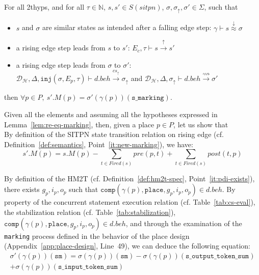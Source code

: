 \begin{lemma}
  \label{lem:re-eq-marking}
  For all \hm2thyps{}, and for all $\tau\in\mathbb{N}$,
  $s,s'\in{}S(sitpn)$, $\sigma,\sigma_\uparrow,\sigma'\in\Sigma$, such
  that
  \begin{itemize}
  \item $s$ and $\sigma$ are similar states as intended after a
    falling edge step:
    $\gamma\vdash{}s\stackrel{\downarrow}{\approx}\sigma$
  \item a rising edge step leads from $s$ to $s'$:
    $E_c,\tau\vdash{}s\xrightarrow{\uparrow}s'$
  \item a rising edge step leads from $\sigma$ to $\sigma'$:\\
    $\mathcal{D}_\mathcal{H},\Delta,\mathtt{inj}(\sigma,E_p,\tau)\vdash{}d.beh\xrightarrow{cs_{\uparrow}}\sigma_{\uparrow}$
    and
    $\mathcal{D}_\mathcal{H},\Delta,\sigma_{\uparrow}\vdash{}d.beh\xrightarrow{\rightsquigarrow}\sigma'$
  \end{itemize}
  then
  $\forall{}p\in{}P,~s'.M(p)=\sigma'(\gamma(p))(\mathtt{s\_marking})$.
  
\end{lemma}

Given all the elements and assuming all the hypotheses expressed in
Lemma~\ref{lem:re-eq-marking}, then, given a place $p\in{}P$, let us
show that \\

By definition of the SITPN state transition relation on rising edge
(cf. Definition~\ref{def:semantics}, Point~\ref{it:new-marking}), we
have:
\begin{equation}\label{eq:re-eq-marking-eqmp}
  s'.M(p)=s.M(p)-\sum\limits_{t\in{}Fired(s)}pre(p,t)+\sum\limits_{t\in{}Fired(s)}post(t,p)
\end{equation}

By definition of the HM2T (cf. Definition~\ref{def:hm2t-spec},
Point~\ref{it:pdi-exists}), there exists $g_p,i_p,o_p$ such that
$\mathtt{comp}(\gamma(p),\mathtt{place},g_p,i_p,o_p)\in{}d.beh$.  By
property of the \hvhdl{} concurrent statement execution relation
(cf. Table~\ref{tab:cs-eval}), the stabilization relation
(cf. Table~\ref{tab:stabilization}),
$\mathtt{comp}(\gamma(p),\mathtt{place},g_p,i_p,o_p)\in{}d.beh$, and
through the examination of the \texttt{marking} process defined in the
behavior of the place design (Appendix~\ref{app:place-design},
Line~49), we can deduce the following equation:
\begin{equation}\label{eq:re-eq-marking-eqsm}
  \begin{split}
    \sigma'(\gamma(p))(\texttt{sm})=\sigma(\gamma(p))(\texttt{sm})-\sigma(\gamma(p))(\texttt{s\_output\_token\_sum})\\
    +\sigma(\gamma(p))(\texttt{s\_input\_token\_sum})
  \end{split}
\end{equation}

